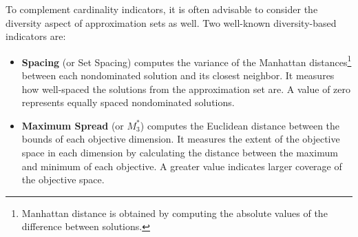 	To complement cardinality indicators, it is often advisable to consider the diversity aspect of approximation sets as well. Two well-known diversity-based indicators are\cite{Zitzler2003Metrics}:
	\begin{itemize}
		\item \textbf{Spacing} (or Set Spacing) \cite{Schott1995} computes the variance of the Manhattan distances\footnote{Manhattan distance is obtained by computing the absolute values of the difference between solutions.} between each nondominated solution and its closest neighbor. It measures how well-spaced the solutions from the approximation set are. A value of zero represents equally spaced nondominated solutions. 
		\item \textbf{Maximum Spread} (or \textbf{$M_3^\ast$}) \cite{Zitzler1999} computes the Euclidean distance between the bounds of each objective dimension. It measures the extent of the objective space in each dimension by calculating the distance between the maximum and minimum of each objective. A greater value indicates larger coverage of the objective space.
		
		

\end{itemize}
